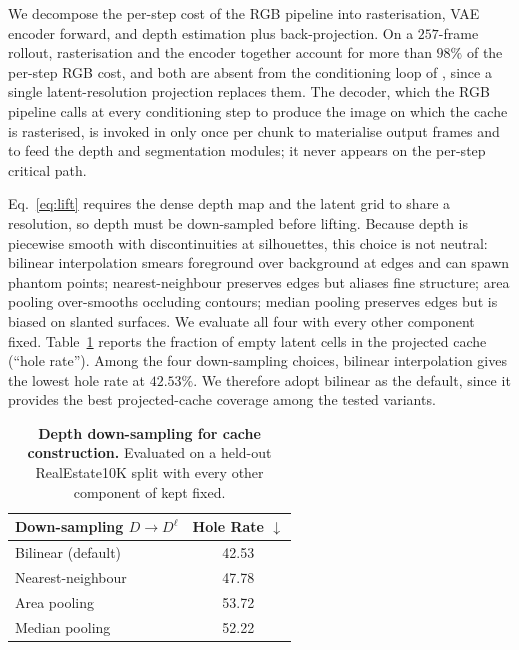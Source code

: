 We decompose the per-step cost of the RGB pipeline into rasterisation, VAE encoder forward, and depth estimation plus back-projection.
On a $257$-frame rollout, rasterisation and the encoder together account for more than $98\%$ of the per-step RGB cost, and both are absent from the conditioning loop of \method{}, since a single latent-resolution projection replaces them.
The decoder, which the RGB pipeline calls at every conditioning step to produce the image on which the cache is rasterised, is invoked in \method{} only once per chunk to materialise output frames and to feed the depth and segmentation modules; it never appears on the per-step critical path.

Eq.~\ref{eq:lift} requires the dense depth map and the latent grid to share a resolution, so depth must be down-sampled before lifting.
Because depth is piecewise smooth with discontinuities at silhouettes, this choice is not neutral: bilinear interpolation smears foreground over background at edges and can spawn phantom points; nearest-neighbour preserves edges but aliases fine structure; area pooling over-smooths occluding contours; median pooling preserves edges but is biased on slanted surfaces.
We evaluate all four with every other component fixed.
Table~\ref{tab:depth_down} reports the fraction of empty latent cells in the projected cache (``hole rate'').
Among the four down-sampling choices, bilinear interpolation gives the lowest hole rate at $42.53\%$.
We therefore adopt bilinear as the default, since it provides the best projected-cache coverage among the tested variants.

\begin{table}[t]
    \centering
    \caption{\textbf{Depth down-sampling for cache construction.} Evaluated on a held-out RealEstate10K split with every other component of \method{} kept fixed.}
    \label{tab:depth_down}
    \begin{tabular}{lc}
    \toprule
    Down-sampling $D \to D^{\ell}$ & Hole Rate $\downarrow$ \\
    \midrule
    Bilinear (default) & 42.53 \\
    Nearest-neighbour  & 47.78 \\
    Area pooling       & 53.72 \\
    Median pooling     & 52.22 \\
    \bottomrule
    \end{tabular}
\end{table}

